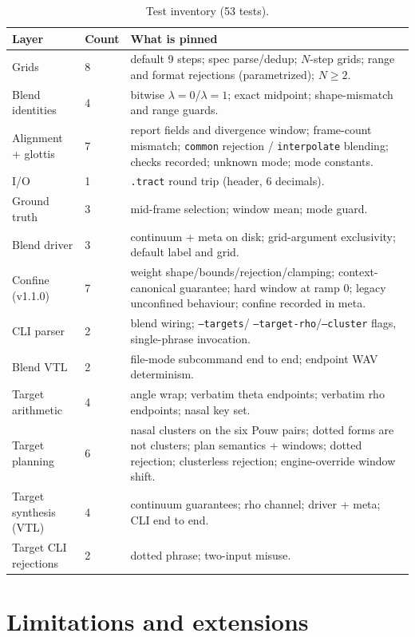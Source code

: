 \documentclass[11pt,a4paper]{article}
\newcommand{\lam}{\lambda}
\newcommand{\code}[1]{\texttt{#1}}
\begin{document}
\begin{table}[t]
\centering\small
\caption{Test inventory (53 tests).}\label{tab:tests}
\begin{tabularx}{\textwidth}{@{}l l X@{}}
\toprule
Layer & Count & What is pinned \\
\midrule
Grids & 8 & default 9 steps; spec parse/dedup; $N$-step grids;
range and format rejections (parametrized); $N \ge 2$. \\
Blend identities & 4 & bitwise $\lam=0$/$\lam=1$; exact midpoint;
shape-mismatch and range guards. \\
Alignment + glottis & 7 & report fields and divergence window;
frame-count mismatch; \code{common} rejection /
\code{interpolate} blending; checks recorded; unknown mode;
mode constants. \\
I/O & 1 & \code{.tract} round trip (header, 6 decimals). \\
Ground truth & 3 & mid-frame selection; window mean; mode guard. \\
Blend driver & 3 & continuum + meta on disk; grid-argument
exclusivity; default label and grid. \\
Confine (v1.1.0) & 7 & weight shape/bounds/rejection/clamping;
context-canonical guarantee; hard window at ramp 0; legacy
unconfined behaviour; confine recorded in meta. \\
CLI parser & 2 & blend wiring; \code{--targets}/%
\code{--target-rho}/\code{--cluster} flags, single-phrase
invocation. \\
Blend VTL & 2 & file-mode subcommand end to end; endpoint WAV
determinism. \\
Target arithmetic & 4 & angle wrap; verbatim theta endpoints;
verbatim rho endpoints; nasal key set. \\
Target planning & 6 & nasal clusters on the six Pouw pairs; dotted
forms are not clusters; plan semantics + windows; dotted rejection;
clusterless rejection; engine-override window shift. \\
Target synthesis (VTL) & 4 & continuum guarantees; rho channel;
driver + meta; CLI end to end. \\
Target CLI rejections & 2 & dotted phrase; two-input misuse. \\
\bottomrule
\end{tabularx}
\end{table}

\section{Limitations and extensions}\label{sec:limits}
\end{document}
